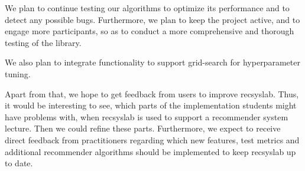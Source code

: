 We plan to continue testing our algorithms to optimize its performance and to detect any possible bugs. Furthermore, we plan to keep the project active, and to engage more participants, so as to conduct a more comprehensive and thorough testing of the library.

We also plan to integrate functionality to support grid-search for hyperparameter tuning.

Apart from that, we hope to get feedback from users to improve recsyslab.
Thus, it would be interesting to see, which parts of the implementation students might have problems with,
when recsyslab is used to support a recommender system lecture. Then we could refine these parts.
Furthermore, we expect to receive direct feedback from practitioners regarding which new features, test metrics and additional recommender algorithms should be implemented to keep recsyslab up to date.
